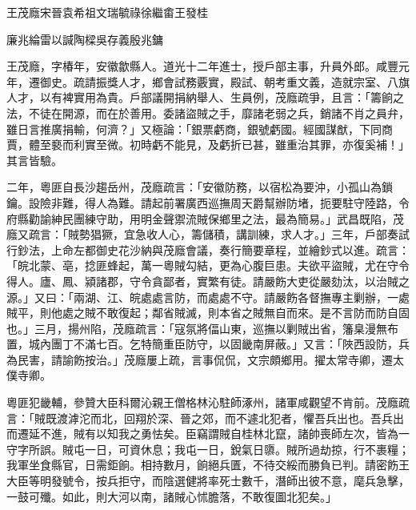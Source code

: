 
\begin{pinyinscope}
王茂廕宋晉袁希祖文瑞毓祿徐繼畬王發桂

廉兆綸雷以諴陶樑吳存義殷兆鏞

王茂廕，字椿年，安徽歙縣人。道光十二年進士，授戶部主事，升員外郎。咸豐元年，遷御史。疏請振獎人才，鄉會試務覈實，殿試、朝考重文義，造就宗室、八旗人才，以有裨實用為貴。戶部議開捐納舉人、生員例，茂廕疏爭，且言：「籌餉之法，不徒在開源，而在於善用。委諸盜賊之手，靡諸老弱之兵，銷諸不肖之員弁，雖日言推廣捐輸，何濟？」又極論：「銀票虧商，銀號虧國。經國謀猷，下同商賈，體至褻而利實至微。初時虧不能見，及虧折已甚，雖重治其罪，亦復奚補！」其言皆驗。

二年，粵匪自長沙趨岳州，茂廕疏言：「安徽防務，以宿松為要沖，小孤山為鎖鑰。設險非難，得人為難。請起前署廣西巡撫周天爵幫辦防堵，扼要駐守陸路，令府縣勸諭紳民團練守助，用明金聲禦流賊保鄉里之法，最為簡易。」武昌既陷，茂廕又疏言：「賊勢猖獗，宜急收人心，籌儲積，講訓練，求人才。」三年，戶部奏試行鈔法，上命左都御史花沙納與茂廕會議，奏行簡要章程，並繪鈔式以進。疏言：「皖北蒙、亳，捻匪蜂起，萬一粵賊勾結，更為心腹巨患。夫欲平盜賊，尤在守令得人。廬、鳳、潁諸郡，守令貪鄙者，實繁有徒。請嚴飭大吏從嚴劾汰，以治賊之源。」又曰：「兩湖、江、皖處處言防，而處處不守。請嚴飭各督撫專主剿辦，一處賊平，則他處之賊不敢復起；鄰省賊滅，則本省之賊無自而來。是不言防而防自固也。」三月，揚州陷，茂廕疏言：「寇氛將偪山東，巡撫以剿賊出省，籓臬漫無布置，城內團丁不滿七百。乞特簡重臣防守，以固畿南屏蔽。」又言：「陜西設防，兵為民害，請諭飭按治。」茂廕屢上疏，言事侃侃，文宗頗鄉用。擢太常寺卿，遷太僕寺卿。

粵匪犯畿輔，參贊大臣科爾沁親王僧格林沁駐師涿州，諸軍咸觀望不肯前。茂廕疏言：「賊既渡滹沱而北，回翔於深、晉之郊，而不遽北犯者，懼吾兵出也。吾兵出而遷延不進，賊有以知我之勇怯矣。臣竊謂賊自桂林北竄，諸帥喪師左次，皆為一守字所誤。賊屯一日，可資休息；我屯一日，銳氣日隳。賊所過劫掠，行不裹糧；我軍坐食縣官，日需鉅餉。相持數月，餉絕兵匱，不待交綏而勝負已判。請密飭王大臣等明發號令，按兵拒守，而陰選健將率死士數千，潛師出彼不意，麾兵急擊，一鼓可殲。如此，則大河以南，諸賊心怵膽落，不敢復圖北犯矣。」


\end{pinyinscope}
